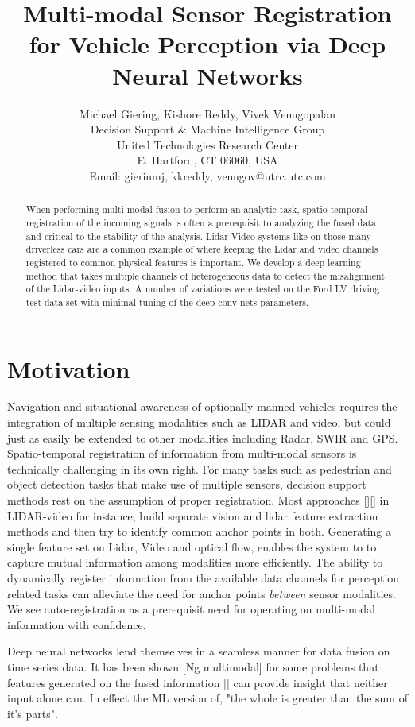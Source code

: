 \documentclass{article}
\title{Multi-modal Sensor Registration for Vehicle Perception via Deep Neural Networks}
\author{Michael Giering, Kishore Reddy, Vivek Venugopalan\\
Decision Support \& Machine Intelligence Group \\
United Technologies Research Center\\
E. Hartford, CT 06060, USA \\
Email: {gierinmj, kkreddy, venugov}@utrc.utc.com}
\begin{document}
\maketitle

\begin{abstract}
When performing multi-modal fusion to perform an analytic task, spatio-temporal registration of the incoming signals is often a prerequisit to analyzing the fused data and critical to the stability of the analysis. Lidar-Video systems like on those many driverless cars are a common example of where keeping the Lidar and video channels registered to common physical features is important. We develop a deep learning method that takes multiple channels of heterogeneous data to detect the misalignment of the Lidar-video inputs. A number of variations were tested on the Ford LV driving test data set with minimal tuning of the deep conv nets parameters. 

\end{abstract}

\section{Motivation}
Navigation and situational awareness of optionally manned vehicles requires the integration of multiple sensing modalities such as LIDAR and video, but could just as easily be extended to other modalities including Radar, SWIR and GPS. Spatio-temporal registration of information from multi-modal sensors is technically challenging in its own right. For many tasks such as pedestrian and object detection tasks that make use of multiple sensors, decision support methods rest on the assumption of proper registration. Most approaches [][] in LIDAR-video for instance, build separate vision and lidar feature extraction methods and then try to identify common anchor points in both. Generating a single feature set on Lidar, Video and optical flow, enables the system to to capture mutual information among modalities more efficiently. The ability to dynamically register information from the available data channels for perception related tasks can alleviate the need for anchor points \emph{between} sensor modalities. We see auto-registration as a prerequisit need for operating on multi-modal information with confidence.

Deep neural networks lend themselves in a seamless manner for data fusion on time series data. It has been shown [Ng multimodal] for some problems that features generated on the fused information [] can provide insight that neither input alone can. In effect the ML version of, "the whole is greater than the sum of it's parts". 
\end{document}
